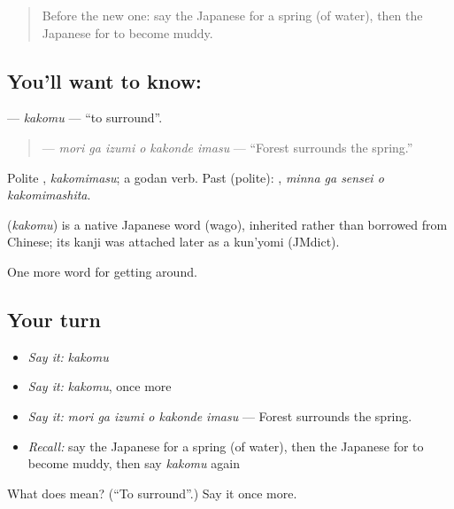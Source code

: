 \begin{quote}
Before the new one: say the Japanese for a spring (of water), then the Japanese for to become muddy.
\end{quote}

\subsection*{You'll want to know: }
\textbf{} — \emph{kakomu} — \textquotedblleft{}to surround\textquotedblright{}.

\begin{quote}
\textbf{  } — \emph{mori ga izumi o kakonde imasu} — \textquotedblleft{}Forest surrounds the spring.\textquotedblright{}
\end{quote}

Polite \textbf{}, \emph{kakomimasu}; a godan verb. Past (polite): \textbf{  }, \emph{minna ga sensei o kakomimashita}.

\begin{cousinweb}
\textbf{} (\emph{kakomu}) is a native Japanese word (wago), inherited rather than borrowed from Chinese; its kanji was attached later as a kun'yomi (JMdict).
\end{cousinweb}

\begin{grammarlens}[title={What you've built}]
One more word for getting around.
\end{grammarlens}

\subsection*{Your turn}
\begin{itemize}
\raggedright
  \item \emph{Say it:} \emph{kakomu}
  \item \emph{Say it:} \emph{kakomu}, once more
  \item \emph{Say it:} \emph{mori ga izumi o kakonde imasu} — Forest surrounds the spring.
  \item \emph{Recall:} say the Japanese for a spring (of water), then the Japanese for to become muddy, then say \emph{kakomu} again
\end{itemize}

\begin{tcolorbox}[breakable,colback=teal!4,colframe=teal!35!black,title={Before you move on}]
What does  mean? (\textquotedblleft{}To surround\textquotedblright{}.) Say it once more.
\end{tcolorbox}
